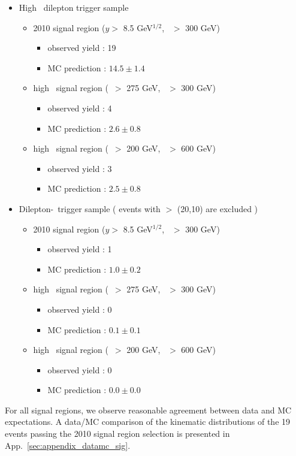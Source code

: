 \begin{itemize}
\item High \pt\ dilepton trigger sample
\begin{itemize}
\item 2010 signal region ($y >$ 8.5 GeV$^{1/2}$, \Ht\ $>$ 300 GeV)
   \begin{itemize} 
   \item observed yield : 19 
   \item MC prediction  : $14.5 \pm 1.4$
   \end{itemize}  
\item high \met\ signal region (\met\ $>$ 275 GeV, \Ht\ $>$ 300 GeV)
   \begin{itemize} 
   \item observed yield : 4 
   \item MC prediction  : $2.6 \pm 0.8$
   \end{itemize}  
\item high \Ht\ signal region (\met\ $>$ 200 GeV, \Ht\ $>$ 600 GeV)
   \begin{itemize} 
   \item observed yield : 3 
   \item MC prediction  : $2.5 \pm 0.8$
   \end{itemize}  
\end{itemize}

\item Dilepton-\Ht\ trigger sample ( events with \pt $>$ (20,10) are excluded )
\begin{itemize}
\item 2010 signal region ($y >$ 8.5 GeV$^{1/2}$, \Ht\ $>$ 300 GeV)
   \begin{itemize} 
   \item observed yield : 1 
   \item MC prediction  : $1.0 \pm 0.2$
   \end{itemize}  
\item high \met\ signal region (\met\ $>$ 275 GeV, \Ht\ $>$ 300 GeV)
   \begin{itemize} 
   \item observed yield : 0 
   \item MC prediction  : $0.1 \pm 0.1$
   \end{itemize}  
\item high \Ht\ signal region (\met\ $>$ 200 GeV, \Ht\ $>$ 600 GeV)
   \begin{itemize} 
   \item observed yield : 0 
   \item MC prediction  : $0.0 \pm 0.0$
   \end{itemize}  
\end{itemize}
\end{itemize}

For all signal regions, we observe reasonable agreement between data and MC expectations. 
A data/MC comparison of the kinematic distributions of the 19 events passing
the 2010 signal region selection is presented in App.~\ref{sec:appendix_datamc_sig}.

